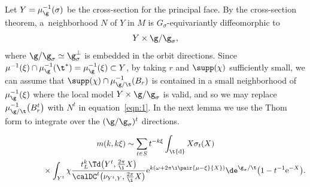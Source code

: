 Let $Y=\mu_{\g}^{-1}(\sigma)$ be the cross-section for the principal face. By the cross-section theorem, a~neighborhood $N$ of $Y$ in $M$ is $G_\sigma$-equivariantly diffeomorphic to
\[ Y\times \g/\g_\sigma, \]
where $\g/\g_\sigma \simeq \g_\sigma^\perp$ is embedded in the orbit directions. Since $\mu^{-1}(\xi)\cap \mu_\g^{-1}(\t^\ast)=\mu_\g^{-1}(\xi)\subset Y$, by taking $r$ and $\supp(\chi)$ sufficiently small, we can assume that $\supp(\chi)\cap \mu_{\g/\t}^{-1}(B_r)$ is contained in a small neighborhood of $\mu_\g^{-1}(\xi)$ where the local model $Y\times \g/\g_\sigma$ is valid, and so we may replace $\mu_{\g/\t}^{-1}\big(B_r^t\big)$ with $N^t$ in equation~\eqref{eqn:1}. In the next lemma we use the Thom form to integrate over the $(\g/\g_\sigma)^t$ directions.
\begin{Lemma}
\begin{gather}
m(k,k\xi)\sim \sum_{t \in S}t^{-k\xi} \int_\t {\rm d}X \sigma_t(X)\nonumber\\
\hphantom{m(k,k\xi)\sim}{}\times \int_{Y^t} \chi \frac{t_L^k\Td\big(Y^t,\tfrac{2\pi}{\i}X\big)}{\calDC^t\big(\nu_{Y^t,Y},\tfrac{2\pi}{\i}X\big)}{\rm e}^{k(\omega+2\pi \i\pair{\mu-\xi}{X})}\de^{\g_\sigma/\t}\big(1-t^{-1}{\rm e}^{-X}\big).\label{eqn:2}
\end{gather}
\end{Lemma}
